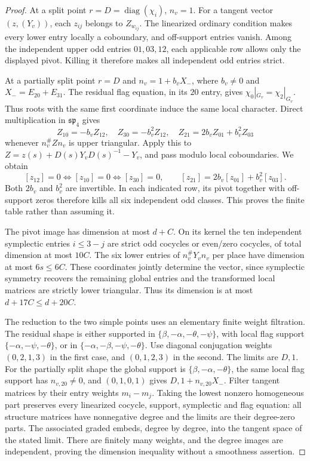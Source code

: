 \begin{proof}
At a split point \(r=D=\operatorname{diag}(\chi_i)\), \(n_v=1\).
For a tangent vector \((z,(Y_v))\), each \(z_{ij}\) belongs to
\(Z_{w_{ij}}\). The linearized ordinary condition makes every
lower entry locally a coboundary, and off-support entries vanish.
Among the independent upper odd entries \(01,03,12\), each
applicable row allows only the displayed pivot. Killing it
therefore makes all independent odd entries strict.

At a partially split point \(r=D\) and
\(n_v=1+b_vX_-\), where \(b_v\ne0\) and
\(X_-=E_{20}+E_{31}\).
The residual flag equation, in its \(20\) entry, gives
\(\chi_0|_{G_v}=\chi_2|_{G_v}\).
Thus roots with the same first coordinate induce the same local
character. Direct multiplication in \(\mathfrak{sp}_4\) gives
\[
 Z_{10}=-b_vZ_{12},\quad Z_{30}=-b_v^2Z_{12},\quad
 Z_{21}=2b_vZ_{01}+b_v^2Z_{03}
\]
whenever \(n_v^\#Zn_v\) is upper triangular.
Apply this to
\(Z=z(s)+D(s)Y_vD(s)^{-1}-Y_v\), and pass modulo local
coboundaries. We obtain
\[
 [z_{12}]=0\Longleftrightarrow[z_{10}]=0
            \Longleftrightarrow[z_{30}]=0,\qquad
 [z_{21}]=2b_v[z_{01}]+b_v^2[z_{03}].
\]
Both \(2b_v\) and \(b_v^2\) are invertible.
In each indicated row, its pivot together with off-support
zeros therefore kills all six independent odd classes.
This proves the finite table rather than assuming it.

The pivot image has dimension at most \(d+C\).
On its kernel the ten independent symplectic entries
\(i\le3-j\) are strict odd cocycles or even/zero cocycles,
of total dimension at most \(10C\).
The six lower entries of \(n_v^\#Y_vn_v\) per place have
dimension at most \(6s\le6C\).
These coordinates jointly determine the vector, since symplectic
symmetry recovers the remaining global entries and the transformed
local matrices are strictly lower triangular.
Thus its dimension is at most \(d+17C\le d+20C\).

The reduction to the two simple points uses an elementary finite
weight filtration. The residual shape is either supported in
\(\{\beta,-\alpha,-\theta,-\psi\}\), with local flag support
\(\{-\alpha,-\psi,-\theta\}\), or in
\(\{-\alpha,-\beta,-\psi,-\theta\}\).
Use diagonal conjugation weights \((0,2,1,3)\) in the first
case, and \((0,1,2,3)\) in the second.
The limits are \(D,1\).
For the partially split shape the global support is
\(\{\beta,-\alpha,-\theta\}\), the same local flag support
has \(n_{v,20}\ne0\), and \((0,1,0,1)\) gives
\(D,1+n_{v,20}X_-\).
Filter tangent matrices by their entry weights \(m_i-m_j\).
Taking the lowest nonzero homogeneous part preserves every
linearized cocycle, support, symplectic and flag equation:
all structure matrices have nonnegative degree and the limits
are their degree-zero parts.
The associated graded embeds, degree by degree, into the tangent
space of the stated limit. There are finitely many weights,
and the degree images are independent, proving the dimension
inequality without a smoothness assertion.


\end{proof}

